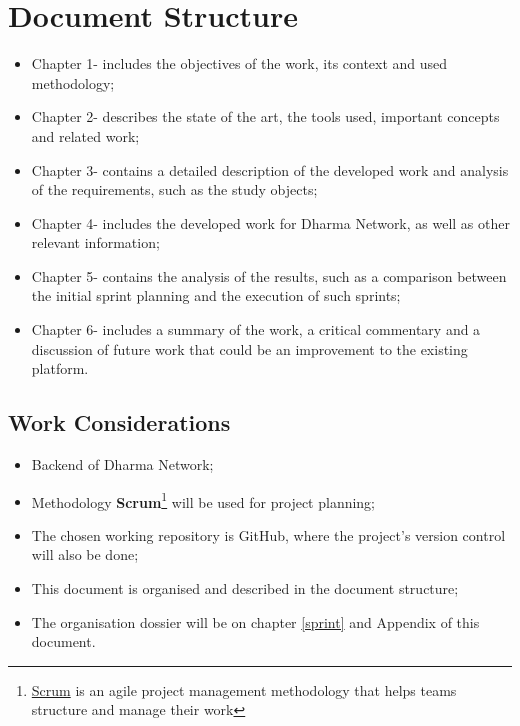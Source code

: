 \section{Document Structure} \label{sec:struct}

\begin{itemize}
    \item Chapter 1- includes the objectives of the work, its context and used methodology;
	\item Chapter 2- describes the state of the art, the tools used, important concepts and related work;
	\item Chapter 3- contains a detailed description of the developed work and analysis of the requirements, such as the study objects;
	\item  Chapter 4- includes the developed work for Dharma Network, as well as other relevant information;
	\item Chapter 5- contains the analysis of the results, such as a comparison between the initial sprint planning and the execution of such sprints;
	\item Chapter 6- includes a summary of the work, a critical commentary and a discussion of future work that could be an improvement to the existing platform.
\end{itemize}


\subsection{Work Considerations}

\begin{itemize} 

	\item Backend of Dharma Network;
	\item Methodology \textbf{Scrum}\footnote{\href{https://www.atlassian.com/agile/scrum}{Scrum} is an agile project management methodology that helps teams structure and manage their work} will be used for project planning;
	\item The chosen working repository is GitHub, where the project's version control will also be done;
	\item This document is organised and described in the document structure;
	\item The organisation dossier will be on chapter \ref{sprint} and Appendix of this document.
\end{itemize}